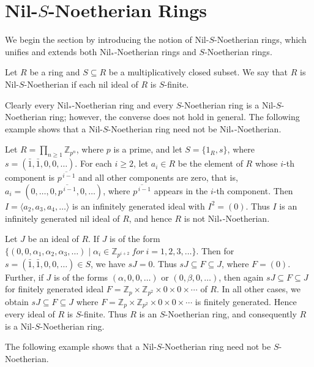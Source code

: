 \documentclass[11pt]{article}
\begin{document}
\section{Nil-$S$-Noetherian Rings}
We begin the section by introducing the notion of Nil-$S$-Noetherian rings, which unifies and extends both \( \text{Nil}_* \)-Noetherian rings and $S$-Noetherian rings. 

\begin{deff}\label{n1}
Let $R$ be a  ring and $S \subseteq R $ be a multiplicatively closed subset.	We say that $R$ is  Nil-$S$-Noetherian if each nil ideal of $R$ is $S$-finite.
\end{deff}

Clearly every Nil$_*$-Noetherian ring and every $S$-Noetherian ring is a Nil-$S$-Noetherian ring; however, the converse does not hold in general. The following example shows that a Nil-$S$-Noetherian ring need not be Nil$_{*}$-Noetherian.
\begin{eg}\label{n12}
	\noindent
	Let $R = \prod\limits_{n \geq 1} \mathbb{Z}_{p^n}$, where $p$ is a prime, and let $S=\{ 1_{R}, s \}$, where $s= (\bar{1}, \bar{1}, 0, 0,  \ldots)$.
	For each $i\geq 2$, let $a_i \in R$ be the element of $R$ whose $i$-th component is $\overline{p^{\,i-1}}$ and all other components are zero, that is,  $a_i=(0,\ldots,0,\overline{p^{\,i-1}},0,\ldots)$, where $\overline{p^{\,i-1}}$ appears in the $i$-th component.
	 Then  $I=\langle a_2,a_3, a_4,  \ldots \rangle$ is an infinitely generated ideal with $I^2 = (0)$.   Thus $I$ is an infinitely generated nil ideal of $R$, and hence $R$ is not  Nil$_{*}$-Noetherian.

	Let $J$ be an ideal of $R$. If $J$ is of the form $\{(0,0, \alpha_{1}, \alpha_{2},\alpha_{3},\ldots)\mid \alpha_{i}\in\mathbb{Z}_{p^{i+2}}~ for~i=1,2,3,\ldots\}$. Then for $s=(\bar{1},\bar{1},0,0,\ldots)\in S$, we have  $sJ=0$. Thus $sJ \subseteq F \subseteq J$, where $F=(0)$. 
	Further, if $J$ is of the forms  $(\alpha,0,0,\ldots)$ or $(0,\beta,0,\ldots)$, then again $sJ\subseteq F\subseteq J$ for  finitely generated ideal  $ F=\mathbb{Z}_p \times \mathbb{Z}_{p^2} \times 0 \times 0 \times \cdots$ of $R$.
	In all other cases,  we obtain 
	$sJ \subseteq F \subseteq J$
	where  $F=\mathbb{Z}_p \times \mathbb{Z}_{p^2} \times 0 \times 0 \times \cdots$
	is finitely generated. Hence every ideal of $R$ is $S$-finite. Thus $R$ is an $S$-Noetherian ring, and consequently $R$ is a Nil-$S$-Noetherian ring.
	\end{eg}

The following example shows that a Nil-$S$-Noetherian ring need not be $S$-Noetherian.
\end{document}
